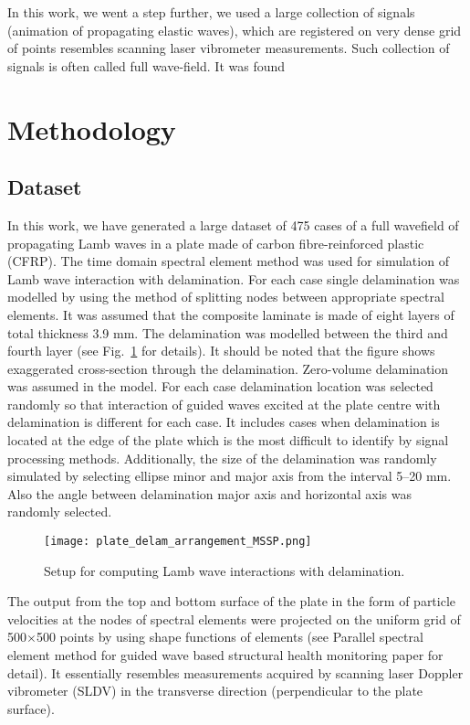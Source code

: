 \documentclass[preprint,9pt]{elsarticle}
\begin{document}
In this work, we went a step further, we used a large collection of signals (animation of propagating elastic waves), which are registered on very dense grid of points resembles scanning laser vibrometer measurements. Such collection of signals is often called full wave-field. 
It was found
\section{Methodology}
\subsection{Dataset}
In this work, we have generated a large dataset of 475 cases of a full wavefield of propagating Lamb waves in a plate made of carbon fibre-reinforced plastic (CFRP).
The time domain spectral element method was used for simulation of Lamb wave interaction with delamination.
For each case single delamination was modelled by using the method of splitting nodes between appropriate spectral elements. 
It was assumed that the composite laminate is made of eight layers of total thickness 3.9 mm.
The delamination was modelled between the third and fourth layer (see Fig.~\ref{fig:plate_setup} for details).
It should be noted that the figure shows exaggerated cross-section through the delamination. 
Zero-volume delamination was assumed in the model. 
For each case delamination location was selected randomly so that interaction of guided waves excited at the plate centre with delamination is different for each case.
It includes cases when delamination is located at the edge of the plate which is the most difficult to identify by signal processing methods.
Additionally, the size of the delamination was randomly simulated by selecting ellipse minor and major axis from the interval 5--20 mm.
Also the angle between delamination major axis and horizontal axis was randomly selected.
\begin{figure}
	\centering
	\texttt{[image: plate\_delam\_arrangement\_MSSP.png]}
	\caption{Setup for computing Lamb wave interactions with delamination.}
	\label{fig:plate_setup}
\end{figure}

The output from the top and bottom surface of the plate in the form of particle velocities at the nodes of spectral elements were projected on the uniform grid of 500\(\times\)500 points by using shape functions of elements (see Parallel spectral element method for guided wave based structural health monitoring paper for detail).
It essentially resembles measurements acquired by scanning laser Doppler vibrometer (SLDV) in the transverse direction (perpendicular to the plate surface).
\end{document}
